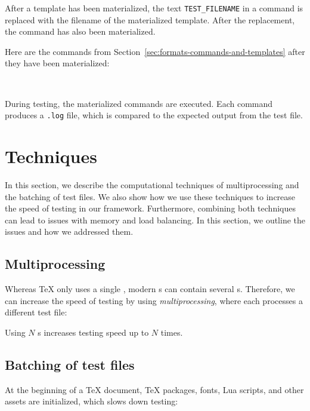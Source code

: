 \documentclass[final]{ltugboat}
\begin{document}
\smallskip
\exampleSeparator

\smallskip
\noindent
{}

\smallskip

After a template has been materialized, the text \texttt{TEST\_FILENAME} in a command is replaced with the filename of the materialized template. After the replacement, the command has also been materialized.

Here are the commands  from Section~\ref{sec:formats-commands-and-templates} after they have been materialized:

\smallskip
\noindent
{} \\[0.8em]

\smallskip

\noindent
During testing, the materialized commands are executed. Each command produces a \texttt{.log} file, which is compared to the expected output from the test file.

\section{Techniques}
\label{sec:techniques}

In this section, we describe the computational techniques of multiprocessing and the batching of test files. We also show how we use these techniques to increase the speed of testing in our framework. Furthermore, combining both techniques can lead to issues with memory and load balancing. In this section, we outline the issues and how we addressed them.

\subsection{Multiprocessing}
\label{sec:multiprocessing}
Whereas \TeX{} only uses a single , modern s can contain several s. Therefore, we can increase the speed of testing by using \emph{multiprocessing}, where each  processes a different test file:

\smallskip
\noindent
\begingroup
\centering

\par
\endgroup

\smallskip
\noindent
Using $N$ s increases testing speed up to $N$ times.

\subsection{Batching of test files}
\label{sec:batching-of-test-files}
At the beginning of a \TeX{} document, \TeX{} packages, fonts, Lua scripts, and other assets are initialized, which slows down testing:
\end{document}
